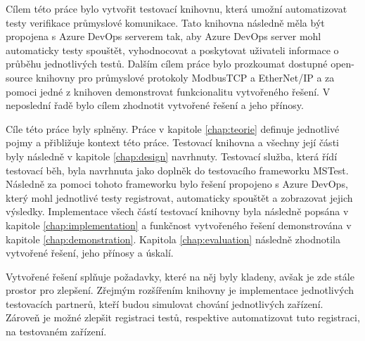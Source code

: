 \begin{conclusion}
Cílem této práce bylo vytvořit testovací knihovnu, která umožní automatizovat testy verifikace průmyslové komunikace. Tato knihovna následně měla být propojena s Azure DevOps serverem tak, aby Azure DevOps server mohl automaticky testy spouštět, vyhodnocovat a poskytovat uživateli informace o průběhu jednotlivých testů. Dalším cílem práce bylo prozkoumat dostupné open-source knihovny pro průmyslové protokoly ModbusTCP a EtherNet/IP a za pomoci jedné z knihoven demonstrovat funkcionalitu vytvořeného řešení. V neposlední řadě bylo cílem zhodnotit vytvořené řešení a jeho přínosy.

Cíle této práce byly splněny. Práce v kapitole \ref{chap:teorie} definuje jednotlivé pojmy a přibližuje kontext této práce. Testovací knihovna a všechny její části byly následně v kapitole \ref{chap:design} navrhnuty. Testovací služba, která řídí testovací běh, byla navrhnuta jako doplněk do testovacího frameworku MSTest. Následně za pomoci tohoto frameworku bylo řešení propojeno s Azure DevOps, který mohl jednotlivé testy registrovat, automaticky spouštět a zobrazovat jejich výsledky. Implementace všech částí testovací knihovny byla následně popsána v kapitole \ref{chap:implementation} a funkčnost vytvořeného řešení demonstrována v kapitole \ref{chap:demonstration}. Kapitola \ref{chap:evaluation} následně zhodnotila vytvořené řešení, jeho přínosy a úskalí. 

Vytvořené řešení splňuje požadavky, které na něj byly kladeny, avšak je zde stále prostor pro zlepšení. Zřejmým rozšířením knihovny je implementace jednotlivých testovacích partnerů, kteří budou simulovat chování jednotlivých zařízení. Zároveň je možné zlepšit registraci testů, respektive automatizovat tuto registraci, na testovaném zařízení. 
\end{conclusion}